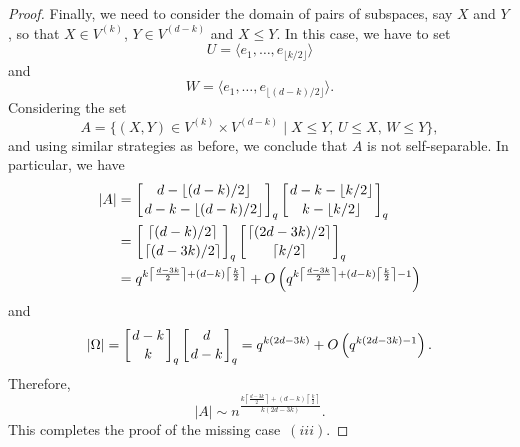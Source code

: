 \documentclass[10pt,a4paper]{amsart}
\begin{document}
\begin{proof}
    Finally, we need to consider the domain of pairs of subspaces, say $X$ and $Y$, so that $X\in V^{(k)}$, $Y\in V^{(d-k)}$ and $X \le Y$. In this case, we have to set
    \[ U = \langle e_1, \ldots, e_{\lfloor k/2 \rfloor} \rangle\] and
    \[ W = \langle e_1, \ldots, e_{\lfloor (d-k)/2 \rfloor} \rangle.\]
    Considering the set
    \[A = \{ (X,Y) \in V^{(k)}\times V^{(d-k)} \mid X \leq Y,\, U \leq X,\, W \leq Y \},\]
    and using similar strategies as before, we conclude that $A$ is not self-separable.
    In particular, we have
    \begin{align*}
        |A| &= \left[ d- \lfloor (d-k)/2\rfloor \atop d - k -\lfloor (d-k)/2\rfloor \right]_q \left[ d - k - \lfloor k/2\rfloor \atop k -\lfloor k/2\rfloor \right]_q
        \\&= \left[ \lceil (d-k)/2 \rceil \atop \lceil (d-3k)/2\rceil \right]_q \left[ \lceil(2d -3k) /2 \rceil \atop \lceil k/2\rceil \right]_q
        \\&= q^{k \left\lceil \frac{d - 3k}{2} \right\rceil + (d-k) \left\lceil \frac{k}{2} \right\rceil} + O\left(q^{k \left\lceil \frac{d - 3k}{2} \right\rceil + (d-k) \left\lceil \frac{k}{2} \right\rceil - 1}\right)
    \end{align*}
    and
    \[|\Omega| = \left[ d-k \atop k \right]_q\left[ d \atop d-k \right]_q = q^{k(2d-3k)} + O\left( q^{k(2d-3k) -1}\right). \]
    Therefore,
    \[ |A| \sim n^{\frac{k \left\lceil \frac{d - 3k}{2} \right\rceil + (d-k) \left\lceil \frac{k}{2} \right\rceil}{k(2d-3k)}} . \]
    This completes the proof of the missing case~$(iii)$.
\end{proof}
\end{document}
